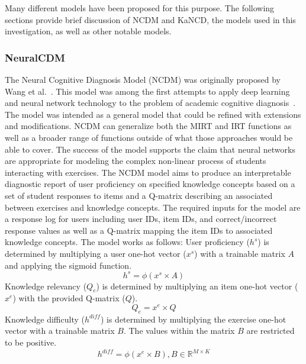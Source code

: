 \documentclass[letterpaper, 12pt, captions=tableabove]{scrreprt}
\begin{document}
			Many different models have been proposed for this purpose. The following sections provide brief discussion of NCDM and KaNCD, the models used in this investigation, as well as other notable models.

			\subsubsection{NeuralCDM}
			\label{sss:neuralCDM}

				The Neural Cognitive Diagnosis Model (NCDM) was originally proposed by Wang et al.~\cite{wang2022}. This model was among the first attempts to apply deep learning and neural network technology to the problem of academic cognitive diagnosis~\cite{wang2024}. The model was intended as a general model that could be refined with extensions and modifications. NCDM can generalize both the MIRT and IRT functions as well as a broader range of functions outside of what those approaches would be able to cover. The success of the model supports the claim that neural networks are appropriate for modeling the complex non-linear process of students interacting with exercises. The NCDM model aims to produce an interpretable diagnostic report of user proficiency on specified knowledge concepts based on a set of student responses to items and a Q-matrix describing an associated between exercises and knowledge concepts. The required inputs for the model are a response log for users including user IDs, item IDs, and correct/incorrect response values as well as a Q-matrix mapping the item IDs to associated knowledge concepts. The model works as follows: User proficiency ($h^s$) is determined by multiplying a user one-hot vector ($x^s$) with a trainable matrix $A$ and applying the sigmoid function. 
\begin{equation}
\label{eqn:ncdmProf}
h^s = \phi(x^s \times A)
\end{equation}
Knowledge relevancy ($Q_e$) is determined by multiplying an item one-hot vector ($x^e$) with the provided Q-matrix ($Q$). 
\begin{equation}
\label{eqn:ncdmKrel}
Q_e = x^e \times Q
\end{equation}
Knowledge difficulty ($h^{diff}$) is determined by multiplying the exercise one-hot vector with a trainable matrix $B$. The values within the matrix $B$ are restricted to be positive. 
\begin{equation}
\label{eqn:ncdmKdif}
h^{diff} = \phi(x^e \times B), B \in \mathbb{R}^{M \times K}
\end{equation}
\end{document}
